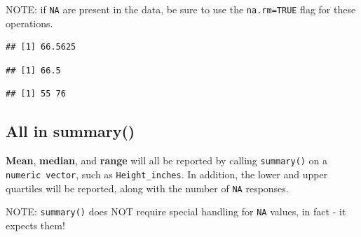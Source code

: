 \documentclass[
]{book}
\newenvironment{Shaded}{\begin{snugshade}}{\end{snugshade}}
\newcommand{\AttributeTok}[1]{\textcolor[rgb]{0.77,0.63,0.00}{#1}}
\newcommand{\FunctionTok}[1]{\textcolor[rgb]{0.00,0.00,0.00}{#1}}
\newcommand{\NormalTok}[1]{#1}
\newcommand{\SpecialCharTok}[1]{\textcolor[rgb]{0.00,0.00,0.00}{#1}}
\begin{document}
NOTE: if \texttt{NA} are present in the data, be sure to use the \texttt{na.rm=TRUE} flag for these operations.

\begin{Shaded}
\end{Shaded}

\begin{verbatim}
## [1] 66.5625
\end{verbatim}

\begin{Shaded}
\end{Shaded}

\begin{verbatim}
## [1] 66.5
\end{verbatim}

\begin{Shaded}
\end{Shaded}

\begin{verbatim}
## [1] 55 76
\end{verbatim}

\hypertarget{all-in-summary}{%
\subsection*{All in summary()}\label{all-in-summary}}

\textbf{Mean}, \textbf{median}, and \textbf{range} will all be reported by calling \texttt{summary()} on a \texttt{numeric\ vector}, such as \texttt{Height\_inches}. In addition, the lower and upper quartiles will be reported, along with the number of \texttt{NA} responses.

NOTE: \texttt{summary()} does NOT require special handling for \texttt{NA} values, in fact - it expects them!
\end{document}
